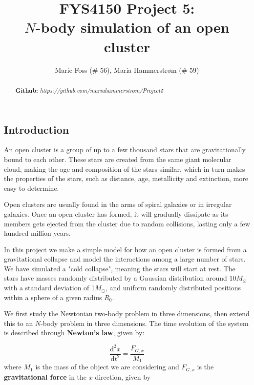 \documentclass{article}
\title{\textbf{FYS4150 Project 5: \\$N$-body simulation of an open cluster}}
\author{Marie Foss (\# 56), Maria Hammerstr{{\o}}m (\# 59)}
\date{}
\begin{document}
\maketitle

\begin{abstract}
	\noindent \lipsum[1]
	\vspace*{2ex}
	
	\noindent \textbf{Github:} \textit{https://github.com/mariahammerstrom/Project5}
	\vspace*{2ex}
\end{abstract}



\begin{multicols}{2}

\section{Introduction}

An open cluster is a group of up to a few thousand stars that are gravitationally bound to each other. These stars are created from the same giant molecular cloud, making the age and composition of the stars similar, which in turn makes the properties of the stars, such as distance, age, metallicity and extinction, more easy to determine. 

Open clusters are usually found in the arms of spiral galaxies or in irregular galaxies. Once an open cluster has formed, it will gradually dissipate as its members gets ejected from the cluster due to random collisions, lasting only a few hundred million years. 


In this project we make a simple model for how an open cluster is formed from a gravitational collapse and model the interactions among a large number of stars. We have simulated a "cold collapse", meaning the stars will start at rest. The stars have masses randomly distributed by a Gaussian distribution around 10$M_{\odot}$ with a standard deviation of 1$M_{\odot}$, and uniform randomly distributed positions within a sphere of a given radius $R_0$. 

We first study the Newtonian two-body problem in three dimensions, then extend this to an $N$-body problem in three dimensions. The time evolution of the system is described through \textbf{Newton's law}, given by:

\begin{equation}\label{eq:ODE}
	\frac{\mathrm{d}^2 x}{\mathrm{d}t^2} = \frac{F_{G,x}}{M_1}
\end{equation}
where $M_1$ is the mass of the object we are considering and $F_{G,x}$ is the \textbf{gravitational force} in the $x$ direction, given by 


\end{multicols}
\end{document}
